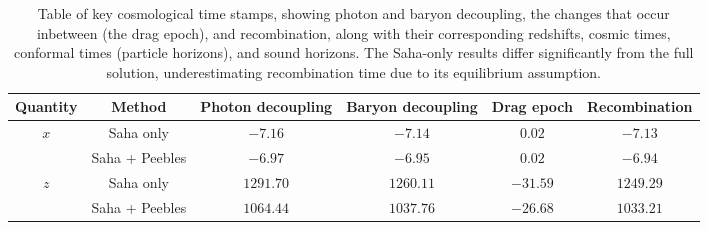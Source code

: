 \documentclass{aa}
\begin{document}
\begin{table*}
  \caption{Table of key cosmological time stamps, showing photon and baryon decoupling, the changes that occur inbetween (the drag epoch), and recombination, along with their corresponding redshifts, cosmic times, conformal times (particle horizons), and sound horizons. The Saha-only results differ significantly from the full solution, underestimating recombination time due to its equilibrium assumption.} 
  \label{table:time stamps decoupling}    %
  \centering                          %
  \begin{tabular}{| c || c || c | c | c | c |}        %
  \hline                %
  Quantity & Method & Photon decoupling & Baryon decoupling & Drag epoch & Recombination \\    %
  \hline\hline                        %
  \multirow{2}{*}{$x$}       & Saha only       & \hspace{4.5pt}$-7.16$  & \hspace{4.5pt}$-7.14$     & \hspace{4.5pt}$0.02$        & \hspace{4.5pt}$-7.13$   \\      
  \cline{2-6}
                           & Saha + Peebles  & \hspace{4.5pt}$-6.97$  & \hspace{4.5pt}$-6.95$     & \hspace{4.5pt}$0.02$        & \hspace{4.5pt}$-6.94$   \\      
  \hline 
  \multirow{2}{*}{$z$}       & Saha only       & \hspace{-4pt}$1291.70$ & \hspace{-4pt}$1260.11$    & \hspace{-7pt}$-31.59$       & \hspace{-4pt}$1249.29$ \\
  \cline{2-6}
                           & Saha + Peebles  & \hspace{-4pt}$1064.44$ & \hspace{-4pt}$1037.76$    & \hspace{-7pt}$-26.68$       & \hspace{-4pt}$1033.21$ \\

\end{tabular}
\end{table*}
\end{document}
